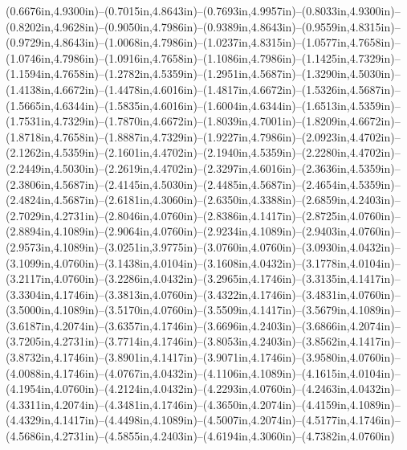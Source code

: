 (0.6676in,4.9300in)--(0.7015in,4.8643in)--(0.7693in,4.9957in)--(0.8033in,4.9300in)--(0.8202in,4.9628in)--(0.9050in,4.7986in)--(0.9389in,4.8643in)--(0.9559in,4.8315in)--(0.9729in,4.8643in)--(1.0068in,4.7986in)--(1.0237in,4.8315in)--(1.0577in,4.7658in)--(1.0746in,4.7986in)--(1.0916in,4.7658in)--(1.1086in,4.7986in)--(1.1425in,4.7329in)--(1.1594in,4.7658in)--(1.2782in,4.5359in)--(1.2951in,4.5687in)--(1.3290in,4.5030in)--(1.4138in,4.6672in)--(1.4478in,4.6016in)--(1.4817in,4.6672in)--(1.5326in,4.5687in)--(1.5665in,4.6344in)--(1.5835in,4.6016in)--(1.6004in,4.6344in)--(1.6513in,4.5359in)--(1.7531in,4.7329in)--(1.7870in,4.6672in)--(1.8039in,4.7001in)--(1.8209in,4.6672in)--(1.8718in,4.7658in)--(1.8887in,4.7329in)--(1.9227in,4.7986in)--(2.0923in,4.4702in)--(2.1262in,4.5359in)--(2.1601in,4.4702in)--(2.1940in,4.5359in)--(2.2280in,4.4702in)--(2.2449in,4.5030in)--(2.2619in,4.4702in)--(2.3297in,4.6016in)--(2.3636in,4.5359in)--(2.3806in,4.5687in)--(2.4145in,4.5030in)--(2.4485in,4.5687in)--(2.4654in,4.5359in)--(2.4824in,4.5687in)--(2.6181in,4.3060in)--(2.6350in,4.3388in)--(2.6859in,4.2403in)--(2.7029in,4.2731in)--(2.8046in,4.0760in)--(2.8386in,4.1417in)--(2.8725in,4.0760in)--(2.8894in,4.1089in)--(2.9064in,4.0760in)--(2.9234in,4.1089in)--(2.9403in,4.0760in)--(2.9573in,4.1089in)--(3.0251in,3.9775in)--(3.0760in,4.0760in)--(3.0930in,4.0432in)--(3.1099in,4.0760in)--(3.1438in,4.0104in)--(3.1608in,4.0432in)--(3.1778in,4.0104in)--(3.2117in,4.0760in)--(3.2286in,4.0432in)--(3.2965in,4.1746in)--(3.3135in,4.1417in)--(3.3304in,4.1746in)--(3.3813in,4.0760in)--(3.4322in,4.1746in)--(3.4831in,4.0760in)--(3.5000in,4.1089in)--(3.5170in,4.0760in)--(3.5509in,4.1417in)--(3.5679in,4.1089in)--(3.6187in,4.2074in)--(3.6357in,4.1746in)--(3.6696in,4.2403in)--(3.6866in,4.2074in)--(3.7205in,4.2731in)--(3.7714in,4.1746in)--(3.8053in,4.2403in)--(3.8562in,4.1417in)--(3.8732in,4.1746in)--(3.8901in,4.1417in)--(3.9071in,4.1746in)--(3.9580in,4.0760in)--(4.0088in,4.1746in)--(4.0767in,4.0432in)--(4.1106in,4.1089in)--(4.1615in,4.0104in)--(4.1954in,4.0760in)--(4.2124in,4.0432in)--(4.2293in,4.0760in)--(4.2463in,4.0432in)--(4.3311in,4.2074in)--(4.3481in,4.1746in)--(4.3650in,4.2074in)--(4.4159in,4.1089in)--(4.4329in,4.1417in)--(4.4498in,4.1089in)--(4.5007in,4.2074in)--(4.5177in,4.1746in)--(4.5686in,4.2731in)--(4.5855in,4.2403in)--(4.6194in,4.3060in)--(4.7382in,4.0760in) 